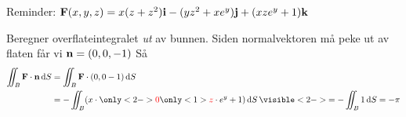 \begin{frame}
  Reminder:
  $
    \mathbf{F}(x,y,z)
    = x(z+z^2)\mathbf{i} - (yz^2 + xe^y)\mathbf{j} + (xze^y + 1)\mathbf{k}
    $ \\ \medskip

    Beregner overflateintegralet \emph{ut} av bunnen. Siden normalvektoren må peke ut av flaten får vi $\mathbf{n} = (0,0,-1)$ Så
    \begin{align*}
        \iint_{B} \F \cdot \vek{n} \dS
        & =  \iint_{B} \F \cdot (0,0-1)\dS  \\
        & = -\iint_{B} (x \cdot \only<2->{\textcolor{red}{0}}\only<1>{\textcolor{red}{z}} \cdot e^{y} + 1) \dS \visible<2->{
        = -\iint_{B} 1 \dS
        = - \pi}
    \end{align*}
\end{frame}

